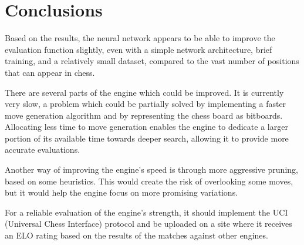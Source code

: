 \chapter{Conclusions}
\label{conclusions}


Based on the results, the neural network appears to be able to improve the evaluation function slightly, even with a simple network architecture, brief training, and a relatively small dataset, compared to the vast number of positions that can appear in chess.

There are several parts of the engine which could be improved. It is currently very slow, a problem which could be partially solved by implementing a faster move generation algorithm and by representing the chess board as bitboards. Allocating less time to move generation enables the engine to dedicate a larger portion of its available time towards deeper search, allowing it to provide more accurate evaluations.

Another way of improving the engine's speed is through more aggressive pruning, based on some heuristics. This would create the risk of overlooking some moves, but it would help the engine focus on more promising variations.

For a reliable evaluation of the engine's strength, it should implement the UCI (Universal Chess Interface) protocol \cite{uci-protocol} and be uploaded on a site where it receives an ELO rating based on the results of the matches against other engines.
